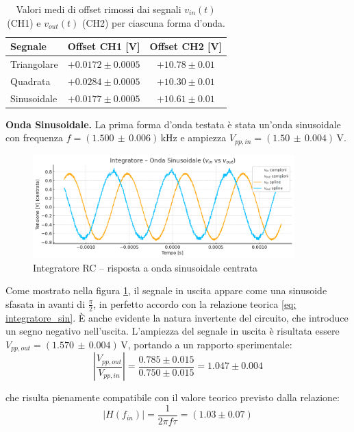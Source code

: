 \documentclass[a4paper,12pt]{article}
\begin{document}
\begin{table}[H]
\centering
\caption{Valori medi di offset rimossi dai segnali $v_{in}(t)$ (CH1) e $v_{out}(t)$ (CH2) per ciascuna forma d’onda.}
\begin{tabular}{lcc}
\toprule
\textbf{Segnale} & \textbf{Offset CH1 [V]} & \textbf{Offset CH2 [V]} \\
\midrule
Triangolare & \( +0.0172 \pm 0.0005 \) & \( +10.78 \pm 0.01 \) \\
Quadrata    & \( +0.0284 \pm 0.0005 \) & \( +10.30 \pm 0.01 \) \\
Sinusoidale & \( +0.0177 \pm 0.0005 \) & \( +10.61 \pm 0.01 \) \\
\bottomrule
\end{tabular}
\label{tab:offset_medi}
\end{table}

\vspace{0.3cm}
\textbf{Onda Sinusoidale.} La prima forma d’onda testata è stata un’onda sinusoidale con frequenza \(f = (1.500\,\pm\,0.006)\,\mathrm{kHz}\) e ampiezza \(V_{pp,in} = (1.50\,\pm\,0.004)\,\mathrm{V}\).

\begin{figure}[H]
  \centering
  \includegraphics[width=0.9\textwidth]{Sinosuidale2.png}
  \caption{Integratore RC – risposta a onda sinusoidale centrata}
  \label{fig:integratore_sin}
\end{figure}

Come mostrato nella figura \ref{fig:integratore_sin}, il segnale in uscita appare come una sinusoide sfasata in avanti di \(\frac{\pi}{2}\), in perfetto accordo con la relazione teorica \eqref{eq: integratore_sin}. È anche evidente la natura invertente del circuito, che introduce un segno negativo nell’uscita. L’ampiezza del segnale in uscita è risultata essere \(V_{pp,out} = (1.570\,\pm\,0.004)\,\mathrm{V}\), portando a un rapporto sperimentale:
\[
\left| \frac{V_{pp, out}}{V_{pp, in}} \right| = \frac{0.785 \pm 0.015}{0.750 \pm 0.015} = 1.047 \pm 0.004
\]

che risulta pienamente compatibile con il valore teorico previsto dalla relazione:
\[
\left| H(f_{in}) \right| = \frac{1}{2\pi f \tau} = (1.03 \pm 0.07)
\]
\end{document}
